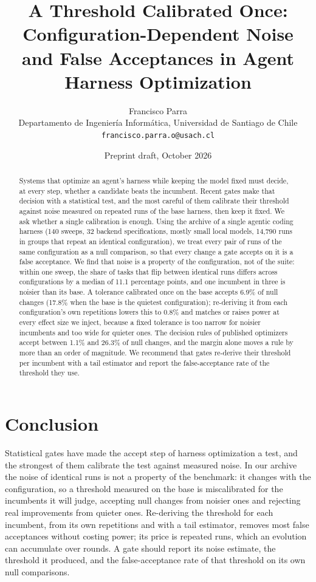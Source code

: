 \documentclass[11pt]{article}
\title{A Threshold Calibrated Once: Configuration-Dependent Noise and False
Acceptances in Agent Harness Optimization}
\author{Francisco Parra\\[2pt]
\small Departamento de Ingenier\'ia Inform\'atica, Universidad de Santiago de Chile\\
\small \texttt{francisco.parra.o@usach.cl}}
\date{Preprint draft, October 2026}
\begin{document}
\maketitle

\begin{abstract}
Systems that optimize an agent's harness while keeping the model fixed must
decide, at every step, whether a candidate beats the incumbent. Recent gates
make that decision with a statistical test, and the most careful of them
calibrate their threshold against noise measured on repeated runs of the base
harness, then keep it fixed. We ask whether a single calibration is enough. Using
the archive of a single agentic coding harness (140 sweeps, 32 backend
specifications, mostly small local models, 14{,}790 runs in groups that repeat an
identical configuration), we treat every pair of runs of the same configuration
as a null comparison, so that every change a gate accepts on it is a false
acceptance. We find that noise is a property of the configuration, not of the
suite: within one sweep, the share of tasks that flip between identical runs
differs across configurations by a median of 11.1 percentage points, and one
incumbent in three is noisier than its base. A tolerance calibrated once on the
base accepts 6.9\% of null changes (17.8\% when the base is the quietest
configuration); re-deriving it from each configuration's own repetitions lowers
this to 0.8\% and matches or raises power at every effect size we inject, because
a fixed tolerance is too narrow for noisier incumbents and too wide for quieter
ones. The decision rules of published optimizers accept between 1.1\% and 26.3\%
of null changes, and the margin alone moves a rule by more than an order of
magnitude. We recommend that gates re-derive their threshold per incumbent with a
tail estimator and report the false-acceptance rate of the threshold they use.
\end{abstract}








\section{Conclusion}\label{sec:conclusion}
Statistical gates have made the accept step of harness optimization a test, and
the strongest of them calibrate the test against measured noise. In our archive the noise of identical runs is not a property of the benchmark: it changes with the configuration, so a threshold measured on the base is
miscalibrated for the incumbents it will judge, accepting null changes from
noisier ones and rejecting real improvements from quieter ones. Re-deriving the
threshold for each incumbent, from its own repetitions and with a tail
estimator, removes most false acceptances without costing power; its price is
repeated runs, which an evolution can accumulate over rounds. A gate should
report its noise estimate, the threshold it produced, and the false-acceptance
rate of that threshold on its own null comparisons.
\end{document}
